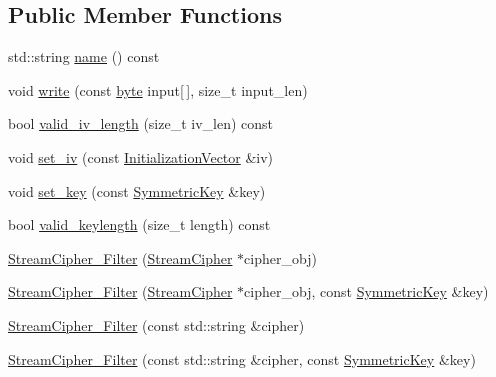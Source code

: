 \subsection*{Public Member Functions}
\begin{DoxyCompactItemize}
\item 
std\-::string \hyperlink{classBotan_1_1StreamCipher__Filter_ac8d6368c8e186a04b09cc128611b0b11}{name} () const 
\item 
void \hyperlink{classBotan_1_1StreamCipher__Filter_a2c4a1f75eb09bae067765a1eba6ec195}{write} (const \hyperlink{namespaceBotan_a7d793989d801281df48c6b19616b8b84}{byte} input\mbox{[}$\,$\mbox{]}, size\-\_\-t input\-\_\-len)
\item 
bool \hyperlink{classBotan_1_1StreamCipher__Filter_adc93b7c50ee1b3d0b3d757b0eecf547f}{valid\-\_\-iv\-\_\-length} (size\-\_\-t iv\-\_\-len) const 
\item 
void \hyperlink{classBotan_1_1StreamCipher__Filter_ad7c8d434f0dd33488f394a6d6be56cbd}{set\-\_\-iv} (const \hyperlink{namespaceBotan_ab6a07e859c4e3a2ccfd68308ec89497e}{Initialization\-Vector} \&iv)
\item 
void \hyperlink{classBotan_1_1StreamCipher__Filter_ac4273781445d2d3d48d060dcb510e41a}{set\-\_\-key} (const \hyperlink{namespaceBotan_a00c78597211d5c63b63e2a57ddb96d38}{Symmetric\-Key} \&key)
\item 
bool \hyperlink{classBotan_1_1StreamCipher__Filter_ad1c94c9803467ed412dd4e0fe7c7fd4d}{valid\-\_\-keylength} (size\-\_\-t length) const 
\item 
\hyperlink{classBotan_1_1StreamCipher__Filter_aee65369504d15514fbe83641255c66b6}{Stream\-Cipher\-\_\-\-Filter} (\hyperlink{classBotan_1_1StreamCipher}{Stream\-Cipher} $\ast$cipher\-\_\-obj)
\item 
\hyperlink{classBotan_1_1StreamCipher__Filter_aa835da01eef7ebefb617e41f82a818fa}{Stream\-Cipher\-\_\-\-Filter} (\hyperlink{classBotan_1_1StreamCipher}{Stream\-Cipher} $\ast$cipher\-\_\-obj, const \hyperlink{namespaceBotan_a00c78597211d5c63b63e2a57ddb96d38}{Symmetric\-Key} \&key)
\item 
\hyperlink{classBotan_1_1StreamCipher__Filter_a456872ccaee4149d2398f52debf75869}{Stream\-Cipher\-\_\-\-Filter} (const std\-::string \&cipher)
\item 
\hyperlink{classBotan_1_1StreamCipher__Filter_a5ba4bb0f7235600a033df6f721898c61}{Stream\-Cipher\-\_\-\-Filter} (const std\-::string \&cipher, const \hyperlink{namespaceBotan_a00c78597211d5c63b63e2a57ddb96d38}{Symmetric\-Key} \&key)
\end{DoxyCompactItemize}
